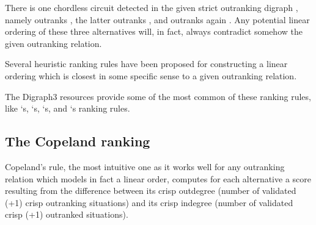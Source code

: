 \documentclass[a4paper,10pt,english]{sphinxhowto}
\begin{document}
There is one chordless circuit detected in the given strict outranking digraph , namely  outranks , the latter outranks , and  outranks again . Any potential linear ordering of these three alternatives will, in fact, always contradict somehow the given outranking relation.

Several heuristic ranking rules have been proposed for constructing a linear ordering which is closest in some specific sense to a given outranking relation.

The Digraph3 resources provide some of the most common of these ranking rules, like  ‘s,  ‘s,  ‘s,  and  ‘s ranking rules.


\subsection{The Copeland ranking}
\label{\detokenize{tutorial:the-copeland-ranking}}
Copeland’s rule, the most intuitive one as it works well for any outranking relation which models in fact a linear order, computes for each alternative a score  resulting from the difference between its crisp out\sphinxhyphen{}degree (number of validated (+1) crisp outranking situations) and its crisp in\sphinxhyphen{}degree (number of validated crisp (+1) outranked situations).

\begin{sphinxVerbatim}[commandchars=\\\{\},numbers=left,firstnumber=1,stepnumber=1]
\end{sphinxVerbatim}
\end{document}
